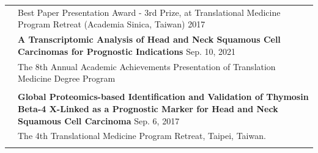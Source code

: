\begin{longtable}{p{1.3in}p{4.8in}}

{\color{OliveGreen}{Honors and award}} 
& Best Paper Presentation Award - 3rd Prize, at Translational Medicine
Program Retreat (Academia Sinica, Taiwan) \hfill 2017\\




 


{\color{OliveGreen}{Presentation}} 
& \textbf{A Transcriptomic Analysis of Head and Neck Squamous Cell Carcinomas for Prognostic Indications} \hfill Sep. 10, 2021 \\
& The 8th Annual Academic Achievements Presentation of Translation Medicine Degree Program \\
& \\

& \textbf{Global Proteomics-based Identification
and Validation of Thymosin Beta-4 X-Linked as a Prognostic Marker for Head
and Neck Squamous Cell Carcinoma} \hfill Sep. 6, 2017 \\
& The 4th Translational Medicine
Program Retreat, Taipei, Taiwan. \\
& \\


\end{longtable}
